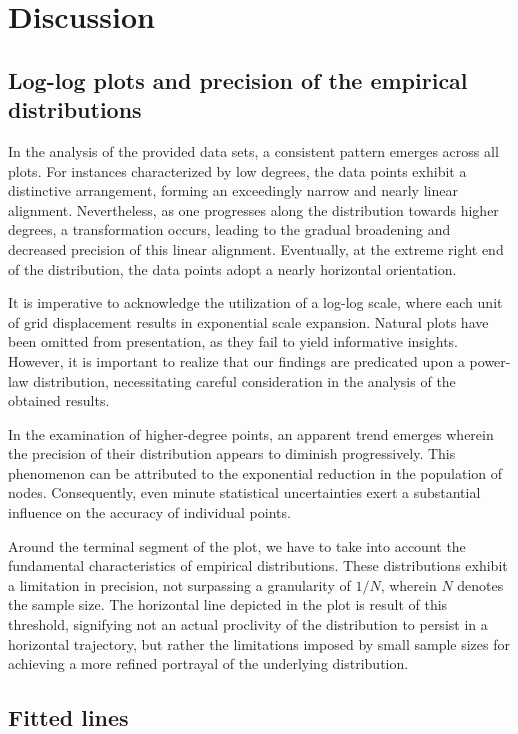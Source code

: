 \documentclass{article}
\begin{document}
\section{Discussion}

\subsection*{Log-log plots and precision of the empirical distributions}
In the analysis of the provided data sets, a consistent pattern emerges across all plots. For instances characterized by low degrees, the data points exhibit a distinctive arrangement, forming an exceedingly narrow and nearly linear alignment. Nevertheless, as one progresses along the distribution towards higher degrees, a transformation occurs, leading to the gradual broadening and decreased precision of this linear alignment. Eventually, at the extreme right end of the distribution, the data points adopt a nearly horizontal orientation. 

It is imperative to acknowledge the utilization of a log-log scale, where each unit of grid displacement results in exponential scale expansion. Natural plots have been omitted from presentation, as they fail to yield informative insights. However, it is important to realize that our findings are predicated upon a power-law distribution, necessitating careful consideration in the analysis of the obtained results.

In the examination of higher-degree points, an apparent trend emerges wherein the precision of their distribution appears to diminish progressively. This phenomenon can be attributed to the exponential reduction in the population of nodes. Consequently, even minute statistical uncertainties exert a substantial influence on the accuracy of individual points.

Around the terminal segment of the plot, we have to take into account the fundamental characteristics of empirical distributions. These distributions exhibit a limitation in precision, not surpassing a granularity of $1/N$, wherein $N$ denotes the sample size. The horizontal line depicted in the plot is result of this threshold, signifying not an actual proclivity of the distribution to persist in a horizontal trajectory, but rather the limitations imposed by small sample sizes for achieving a more refined portrayal of the underlying distribution.

\subsection*{Fitted lines}
\end{document}
